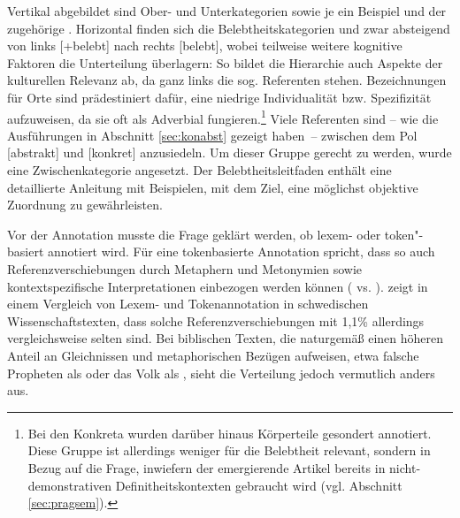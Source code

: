 Vertikal abgebildet sind Ober- und Unterkategorien sowie je ein Beispiel und der zugehörige . Horizontal finden sich die Belebtheitskategorien und zwar absteigend von links [+belebt] nach rechts [\textminus{}belebt],  wobei teilweise weitere kognitive Faktoren die Unterteilung überlagern: So bildet die Hierarchie auch Aspekte der kulturellen Relevanz ab, da ganz links die sog.  Referenten stehen. Bezeichnungen für Orte sind prädestiniert dafür, eine niedrige Individualität bzw. Spezifizität aufzuweisen, da sie oft als Adverbial fungieren.\footnote{Bei den Konkreta wurden darüber hinaus Körperteile gesondert annotiert. Diese Gruppe ist allerdings weniger für die Belebtheit relevant, sondern in Bezug auf die Frage, inwiefern der emergierende Artikel bereits in nicht-demonstrativen Definitheitskontexten gebraucht wird (vgl. Abschnitt \ref{sec:pragsem}).} Viele Referenten sind -- wie die Ausführungen in Abschnitt \ref{sec:konabst} gezeigt haben~-- zwischen dem Pol [abstrakt] und [konkret] anzusiedeln. Um dieser Gruppe gerecht zu werden, wurde eine Zwischenkategorie angesetzt. Der Belebtheitsleitfaden enthält eine detaillierte Anleitung mit Beispielen, mit dem Ziel, eine möglichst objektive Zuordnung zu gewährleisten.

Vor der Annotation musste die Frage geklärt werden, ob lexem- oder token"-basiert annotiert wird. Für eine tokenbasierte Annotation spricht, dass so auch Referenzverschiebungen durch Metaphern und Metonymien sowie kontextspezifische Interpretationen einbezogen werden können ( vs. ). \textcite{Ovrelid2009} zeigt in einem Vergleich von Lexem- und Token\-annotation in schwedischen Wissenschaftstexten, dass solche Referenzverschiebungen mit 1,1\%  allerdings vergleichsweise selten sind.  Bei biblischen Texten, die naturgemäß einen höheren Anteil an Gleichnissen und metaphorischen Bezügen aufweisen, etwa falsche Propheten als  oder das Volk als , sieht die Verteilung jedoch vermutlich anders aus. 

